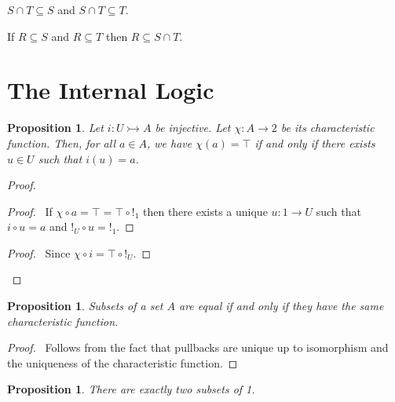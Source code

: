 \documentclass{book}
\let\qed\relax
\newtheorem{prop}[ax]{Proposition}
\theoremstyle{definition}
\begin{document}
$S \cap T \subseteq S$ and $S \cap T \subseteq T$.

If $R \subseteq S$ and $R \subseteq T$ then $R \subseteq S \cap T$.

\section{The Internal Logic}

\begin{prop}
\label{prop:charfun}
Let $i : U \rightarrowtail A$ be injective. Let $\chi : A \rightarrow 2$ be its characteristic function. Then, for all $a \in A$, we have $\chi(a) = \top$ if and only if there exists $u \in U$ such that $i(u) = a$.
\end{prop}

\begin{proof}
\pf
{}
\begin{proof}
	\pf\ If $\chi \circ a = \top = \top \circ !_1$ then there exists a unique $u : 1 \rightarrow U$ such that $i \circ u = a$ and $!_U \circ u = !_1$.
\end{proof}
\begin{proof}
	\pf\ Since $\chi \circ i = \top \circ !_U$.
\end{proof}
\qed
\end{proof}

\begin{prop}
Subsets of a set $A$ are equal if and only if they have the same characteristic function.
\end{prop}

\begin{proof}
\pf\ Follows from the fact that pullbacks are unique up to isomorphism and the uniqueness of the characteristic function. \qed
\end{proof}

\begin{prop}
There are exactly two subsets of 1.
\end{prop}
\end{document}
